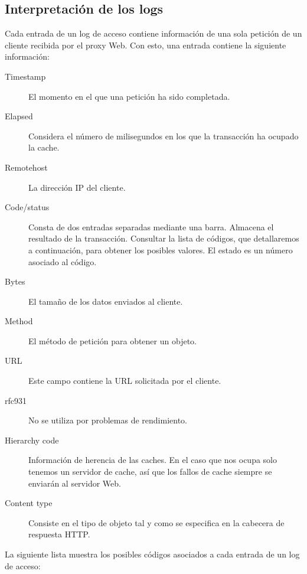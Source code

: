 \documentclass[twocolumn]{Jornadas}
\begin{document}
\subsection{Interpretación de los logs}

Cada entrada de un log de acceso contiene información de una sola petición de un cliente recibida por el proxy Web. Con esto, una entrada contiene la siguiente información:

\begin{description}
\item[Timestamp] El momento en el que una petición ha sido completada.
\item[Elapsed] Considera el número de milisegundos en los que la transacción ha ocupado la cache.
\item[Remotehost] La dirección IP del cliente.
\item[Code/status] Consta de dos entradas separadas mediante una barra. Almacena el resultado de la transacción. Consultar la lista de códigos, que detallaremos a continuación, para obtener los posibles valores.
El estado es un número asociado al código.
\item[Bytes] El tamaño de los datos enviados al cliente.
\item[Method] El método de petición para obtener un objeto.
\item[URL] Este campo contiene la URL solicitada por el cliente.
\item[rfc931] No se utiliza por problemas de rendimiento.
\item[Hierarchy code] Información de herencia de las caches. En el caso que nos ocupa solo tenemos un servidor de cache, así que los fallos de cache siempre se enviarán al servidor Web. 
\item[Content type] Consiste en el tipo de objeto tal y como se especifica en la cabecera de respuesta HTTP.
\end{description}

La siguiente lista muestra los posibles códigos asociados a cada entrada de un log de acceso:
\end{document}
